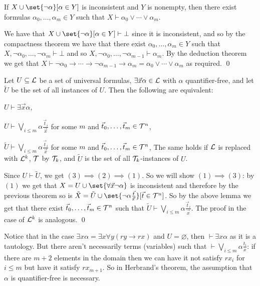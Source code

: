 \eexam

\blemm

    If $X\cup\set{\neg\alpha}[\alpha\in Y]$ is inconsistent and $Y$ is nonempty, then there exist formulas $\alpha_0,\dots,\alpha_m\in Y$ such that $X\vdash\alpha_0\lor\cdots\lor\alpha_m$.

\elemm

We have that $X\cup\set{\neg\alpha}[\alpha\in Y]\vdash\bot$ since it is inconsistent, and so by the compactness theorem we have that there exist $\alpha_0,\dots,\alpha_m\in Y$ such that
$X,\neg\alpha_0,\dots,\neg\alpha_m\vdash\bot$ and so $X,\neg\alpha_0,\dots,\neg\alpha_{m-1}\vdash\alpha_m$.
By the deduction theorem we get that $X\vdash\neg\alpha_0\to\cdots\to\neg\alpha_{m-1}\to\alpha_m = \alpha_0\lor\cdots\lor\alpha_m$ as required.
\qed

\bthrm[title=Herbrand's Theorem, name=herbrandstheorem]

    Let $U\subseteq{\cal L}$ be a set of universal formulas, $\exists\vec x\alpha\in{\cal L}$ with $\alpha$ quantifier-free, and let $\tilde U$ be the set of all instances of $U$.
    Then the following are equivalent:
    \benum
        \item $U\vdash\exists\vec x\alpha$,
        \item $U\vdash\bigvee_{i\leq m}\alpha\frac{\vec t_i}{\vec x}$ for some $m$ and $\vec t_0,\dots,\vec t_m\in{\cal T}^n$,
        \item $\tilde U\vdash\bigvee_{i\leq m}\alpha\frac{\vec t_i}{\vec x}$ for some $m$ and $\vec t_0,\dots,\vec t_m\in{\cal T}^n$,
    \eenum
    The same holds if ${\cal L}$ is replaced with ${\cal L}^k$, ${\cal T}$ by ${\cal T}_k$, and $\tilde U$ is the set of all ${\cal T}_k$-instances of $U$.

\ethrm

Since $U\vdash\tilde U$, we get $(3)\implies(2)\implies(1)$.
So we will show $(1)\implies(3)$: by $(1)$ we get that $X=U\cup\set{\forall\vec x\neg\alpha}$ is inconsistent and therefore by the previous theorem so is
$\tilde X=\tilde U\cup\set{\neg\alpha\frac{\vec t}{\vec x}}[\vec t\in{\cal T}^n]$.
So by the above lemma we get that there exist $\vec t_0,\dots,\vec t_m\in{\cal T}^n$ such that $\tilde U\vdash\bigvee_{i\leq m}\alpha\frac{\vec t_i}{\vec x}$.
The proof in the case of ${\cal L}^k$ is analogous.
\qed

Notice that in the case $\exists x\alpha=\exists x\forall y(ry\to rx)$ and $U=\varnothing$, then $\vdash\exists x\alpha$ as it is a tautology.
But there aren't necessarily terms (variables) such that $\vdash\bigvee_{i\leq m}\alpha\frac{t_i}x$: if there are $m+2$ elements in the domain then we can have it not satisfy $rx_i$ for $i\leq m$ but have
it satisfy $rx_{m+1}$.
So in Herbrand's theorem, the assumption that $\alpha$ is quantifier-free is necessary.

